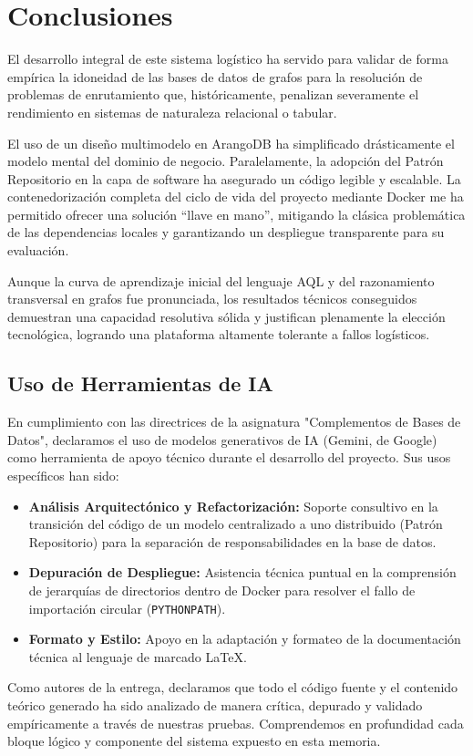 \chapter{Conclusiones}\label{cap:conclusiones}

El desarrollo integral de este sistema logístico ha servido para validar de forma empírica la idoneidad de las bases de datos de grafos para la resolución de problemas de enrutamiento que, históricamente, penalizan severamente el rendimiento en sistemas de naturaleza relacional o tabular.

El uso de un diseño multimodelo en ArangoDB ha simplificado drásticamente el modelo mental del dominio de negocio. Paralelamente, la adopción del Patrón Repositorio en la capa de software ha asegurado un código legible y escalable. La contenedorización completa del ciclo de vida del proyecto mediante Docker me ha permitido ofrecer una solución ``llave en mano'', mitigando la clásica problemática de las dependencias locales y garantizando un despliegue transparente para su evaluación.

Aunque la curva de aprendizaje inicial del lenguaje AQL y del razonamiento transversal en grafos fue pronunciada, los resultados técnicos conseguidos demuestran una capacidad resolutiva sólida y justifican plenamente la elección tecnológica, logrando una plataforma altamente tolerante a fallos logísticos.

\section*{Uso de Herramientas de IA}
En cumplimiento con las directrices de la asignatura "Complementos de Bases de Datos", declaramos el uso de modelos generativos de IA (Gemini, de Google) como herramienta de apoyo técnico durante el desarrollo del proyecto. Sus usos específicos han sido:
\begin{itemize}
    \item \textbf{Análisis Arquitectónico y Refactorización:} Soporte consultivo en la transición del código de un modelo centralizado a uno distribuido (Patrón Repositorio) para la separación de responsabilidades en la base de datos.
    \item \textbf{Depuración de Despliegue:} Asistencia técnica puntual en la comprensión de jerarquías de directorios dentro de Docker para resolver el fallo de importación circular (\texttt{PYTHONPATH}).
    \item \textbf{Formato y Estilo:} Apoyo en la adaptación y formateo de la documentación técnica al lenguaje de marcado LaTeX.
\end{itemize}

Como autores de la entrega, declaramos que todo el código fuente y el contenido teórico generado ha sido analizado de manera crítica, depurado y validado empíricamente a través de nuestras pruebas. Comprendemos en profundidad cada bloque lógico y componente del sistema expuesto en esta memoria.